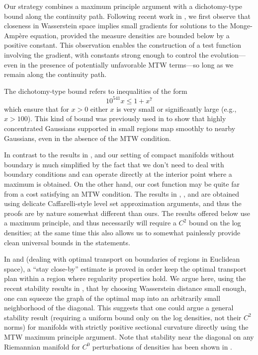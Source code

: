 \documentclass[11pt,letterpaper]{amsart}%
\numberwithin{equation}{section}
\begin{document}
Our strategy combines a maximum principle argument with a dichotomy-type bound along the continuity path. Following recent work in \cite{KLM}, we first observe that closeness in Wasserstein space implies small gradients for solutions to the Monge-Amp\`ere equation, provided the measure densities are bounded below by a positive constant. This observation enables the construction of a test function involving the gradient, with constants strong enough to control the evolution—even in the presence of potentially unfavorable MTW terms—so long as we remain along the continuity path.

The dichotomy-type bound refers to inequalities of the form
$$ 10^{541}x \leq 1 + x^{7}$$which ensure that for $x>0$ either $x$  is very small or significantly large (e.g., $x>100$). This kind of bound was previously used in \cite{W_log} to show that highly concentrated Gaussians supported in small regions map smoothly to nearby Gaussians, even in the absence of the MTW condition.



In contrast to the results in  \cite{CGN}, \cite{CF2} and \cite{AK}  our setting of compact manifolds without boundary is much simplified by the fact that we don't need to deal with boundary conditions and can operate directly at the interior point where a maximum is obtained.  On the other hand, our cost function may be quite far from a cost satisfying an MTW condition.    The results in  \cite{CGN}, \cite{CF2},   and  \cite{CF} are obtained using delicate Caffarelli-style level set approximation arguments, and thus the proofs are by nature somewhat different than ours.  The results offered below use a maximum principle, and thus necessarily will require a $C^2$ bound on the log densities; at the same time this also allows us to somewhat painlessly provide clean universal bounds in the statements.  

In \cite{KW} and \cite{JK2} (dealing with optimal transport on boundaries of regions in Euclidean space), a ``stay close-by'' estimate is proved in order keep the optimal transport plan within a region where regularity properties hold.   We argue here, using the recent stability results in  \cite{KLM}, that by choosing Wasserstein distance small enough, one can squeeze the graph of the optimal map into an arbitrarily small neighborhood of the diagonal.  This suggests that one could argue a general stability result (requiring a uniform bound only on the log densities, not their $C^2$ norms)   for manifolds with strictly positive sectional curvature directly using the MTW maximum principle argument.  Note that stability near the diagonal on any Riemannian manifold for $C^0$ perturbations of densities has been shown in \cite[Corollary 2.2]{CF}.  
\end{document}
